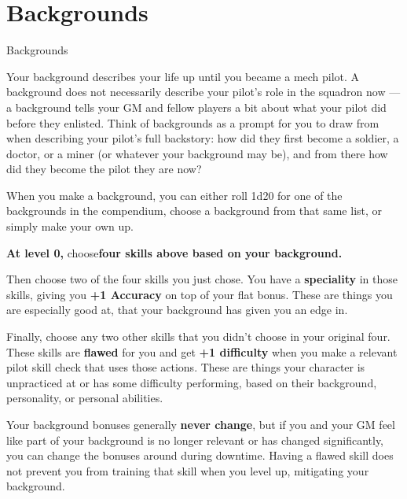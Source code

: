 \section{Backgrounds}
                                               Backgrounds

Your background describes your life up until you became a mech pilot. A background does not
necessarily describe your pilot’s role in the squadron now — a background tells your GM and
fellow players a bit about what your pilot did before they enlisted. Think of backgrounds as a
prompt for you to draw from when describing your pilot’s full backstory: how did they first
become a soldier, a doctor, or a miner (or whatever your background may be), and from there
how did they become the pilot they are now?


When you make a background, you can either roll 1d20 for one of the backgrounds in the
compendium, choose a background from that same list, or simply make your own up.


\textbf{At level 0,} choose\textbf{four skills above based on your background.} 

Then choose two of the four skills you just chose. You have a \textbf{speciality} in those skills, giving
you \textbf{+1 Accuracy} on top of your flat bonus. These are things you are especially good at, that
your background has given you an edge in.

Finally, choose any two other skills that you didn’t choose in your original four. These skills are
\textbf{flawed} for you and get \textbf{+1 difficulty} when you make a relevant pilot skill check that uses those
actions. These are things your character is unpracticed at or has some difficulty performing,
based on their background, personality, or personal abilities.


Your background bonuses generally \textbf{never change}, but if you and your GM feel like part of your
background is no longer relevant or has changed significantly, you can change the bonuses
around during downtime. Having a flawed skill does not prevent you from training that skill when
you level up, mitigating your background.